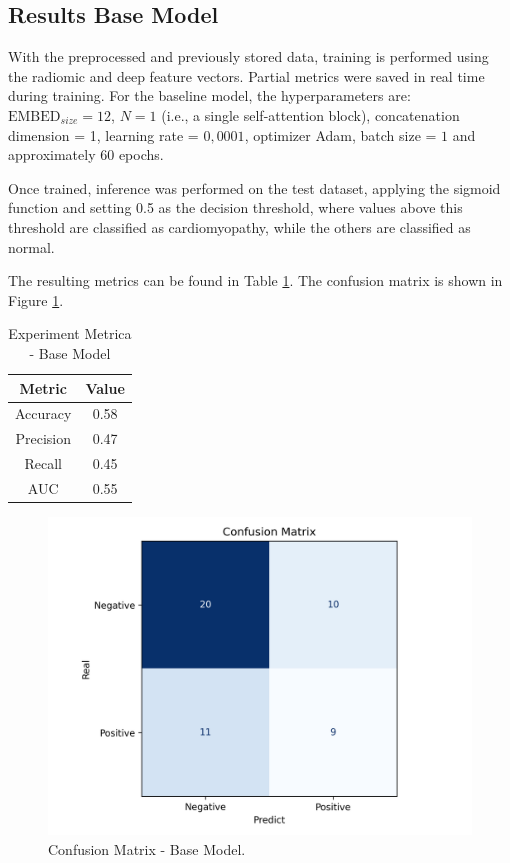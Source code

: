\documentclass[journal,twoside,web]{ieeecolor}
\begin{document}
\subsection{Results Base Model}

With the preprocessed and previously stored data, training is performed using the radiomic and deep feature vectors. Partial metrics were saved in real time during training.  For the baseline model, the hyperparameters are: $\text{EMBED}_{size} = 12$, $N = 1$ (i.e., a single self-attention block), concatenation dimension = 1, learning rate = $0,0001$, optimizer Adam, batch size = $1$ and approximately $60$ epochs.

Once trained, inference was performed on the test dataset, applying the sigmoid function and setting 0.5 as the decision threshold, where values above this threshold are classified as cardiomyopathy, while the others are classified as normal.  

The resulting metrics can be found in Table \ref{tab:metrics}. The confusion matrix is shown in Figure \ref{fig05}.

\begin{table}[h!]
    \centering
    \caption{Experiment Metrica - Base Model}
    \begin{tabular}{|c|c|}
    \hline 
          \textbf{Metric} & \textbf{Value} \\ 
    \hline 
        Accuracy & 0.58 \\ 
    \hline 
        Precision & 0.47 \\ 
    \hline 
        Recall & 0.45 \\ 
    \hline 
        AUC & 0.55 \\ 
    \hline 
    \end{tabular} 
    \label{tab:metrics}
\end{table}

\begin{figure}[h]
    \centerline{\includegraphics[width=\columnwidth]{figures/fig05.png}}
    \caption{Confusion Matrix -  Base Model.}
    \label{fig05}
\end{figure}
\end{document}
